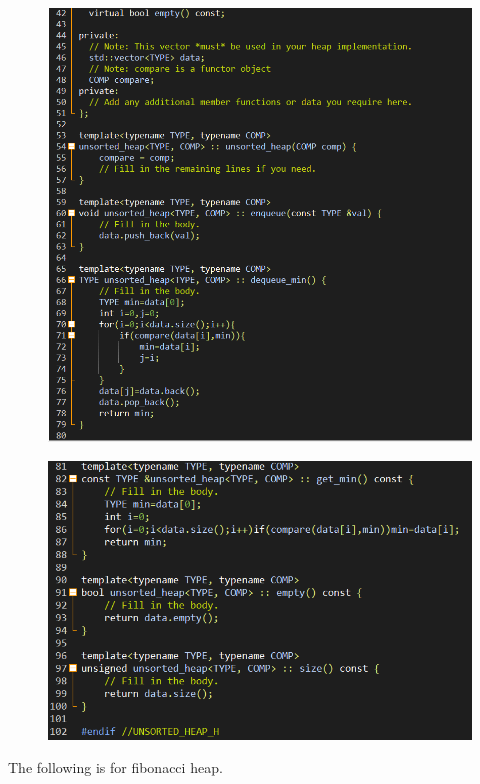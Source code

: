 \documentclass[12pt]{article}
\begin{document}
\begin{figure}[H]
\centering
\includegraphics[scale=0.6]{P11.png}
\end{figure}
\begin{figure}[H]
\centering
\includegraphics[scale=0.6]{P12.png}
\end{figure}
The following is for fibonacci heap.
\end{document}
